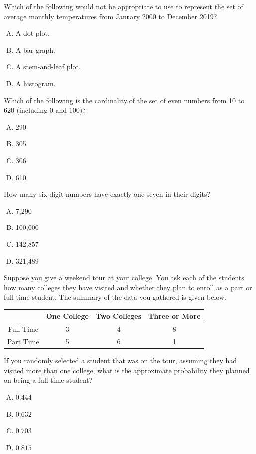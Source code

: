 \documentclass[12pt,letterpaper]{exam}
\begin{document}
\begin{questions}
\vfill

\question Which of the following would not be appropriate to use to represent the set of average monthly temperatures from January 2000 to December 2019?
	\begin{enumerate}[A.]
	\item A dot plot.
	\item A bar graph.
	\item A stem-and-leaf plot.
	\item A histogram.
	\end{enumerate}

\vfill

\question Which of the following is the cardinality of the set of even numbers from 10 to 620 (including 0 and 100)?
	\begin{enumerate}[A.]
	\item 290
	\item 305
	\item 306
	\item 610
	\end{enumerate}

\vfill

\question How many six-digit numbers have exactly one seven in their digits?
	\begin{enumerate}[A.]
	\item 7,290
	\item 100,000
	\item 142,857
	\item 321,489
	\end{enumerate}

\vfill

\question Suppose you give a weekend tour at your college. You ask each of the students how many colleges they have visited and whether they plan to enroll as a part or full time student. The summary of the data you gathered is given below. \par
	\begin{table}[H]
	\centering
	\begin{tabular}{|c|c|c|c|} \hline
	& One College & Two Colleges & Three or More \\ \hline
	Full Time & 3 & 4 & 8 \\ \hline
	Part Time & 5 & 6 & 1 \\ \hline
	\end{tabular}
	\end{table}
If you randomly selected a student that was on the tour, assuming they had visited more than one college, what is the approximate probability they planned on being a full time student?
	\begin{enumerate}[A.]
	\item $0.444$
	\item $0.632$
	\item $0.703$
	\item $0.815$
	\end{enumerate}


\end{questions}
\end{document}
